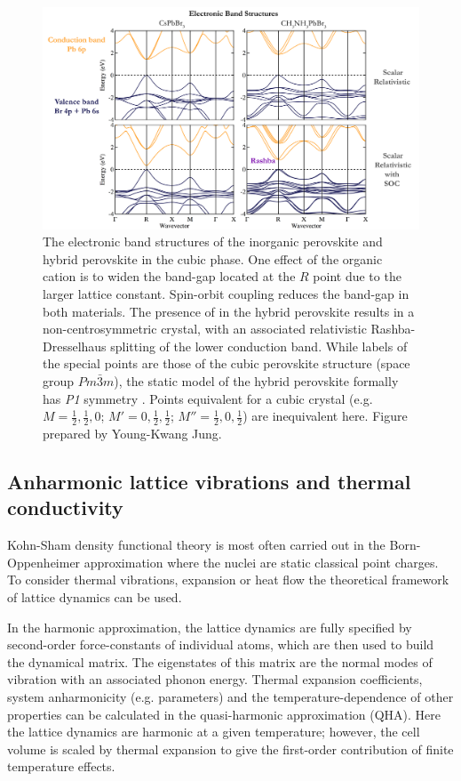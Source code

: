 \begin{figure} \label{f3}
\includegraphics[width=1.0\columnwidth]{./figures/ch2/f3.png}
\caption[Electronic band structures of  and ]{
The electronic band structures of the inorganic perovskite  and hybrid perovskite  in the cubic phase.
    One effect of the organic cation is to widen the band-gap located at the $R$ point due to the larger lattice constant. 
    Spin-orbit coupling reduces the band-gap in both materials. 
The presence of  in the hybrid perovskite results in a non-centrosymmetric crystal, with an associated relativistic Rashba-Dresselhaus splitting of the lower conduction band.
While labels of the special points are those of the cubic perovskite structure (space group $Pm\bar{3}m$),  
    the static model of the hybrid perovskite formally has  \textit{P1} symmetry . 
Points equivalent for a cubic crystal (e.g. $M=\frac{1}{2},\frac{1}{2},0$; $M'=0, \frac{1}{2},\frac{1}{2}$;  $M''=\frac{1}{2},0,\frac{1}{2}$) are inequivalent here. Figure prepared by Young-Kwang Jung.
}
\label{fig3}
\end{figure}

\subsection{Anharmonic lattice vibrations and thermal conductivity} \label{ch2anharmonic}

Kohn-Sham density functional theory is most often carried out in the Born-Oppenheimer approximation where the nuclei are static classical point charges. 
To consider thermal vibrations, expansion or heat flow the theoretical framework of lattice dynamics can be used.\autocite{Stoffel2010} 
 
In the harmonic approximation, the lattice dynamics are fully specified by second-order force-constants of individual atoms, which are then used to build the dynamical matrix. 
The eigenstates of this matrix are the normal modes of vibration with an associated phonon energy. 
Thermal expansion coefficients, system anharmonicity (e.g. \grun parameters) and the temperature-dependence of other properties can be calculated in the quasi-harmonic approximation (QHA). 
Here the lattice dynamics are harmonic at a given temperature; however, the cell volume is scaled by thermal expansion to give the first-order contribution of finite temperature effects. 

